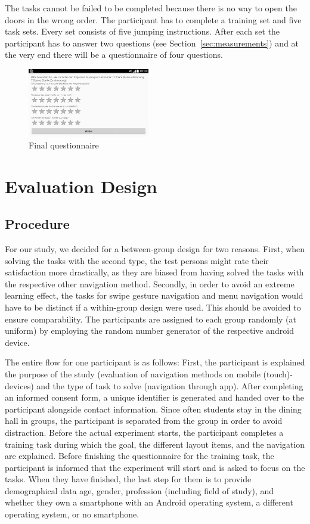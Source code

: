 \documentclass{sig-alternate-05-2015}
\begin{document}
The tasks cannot be failed to be completed because there is no way to open the doors in the wrong order. The participant has to complete a training set and five task sets. Every set consists of five jumping instructions. After each set the participant has to answer two questions (see Section~\ref{sec:measurements}) and at the very end there will be a questionnaire of four questions.
\begin{figure}
	\centering
	\includegraphics[width=0.475\textwidth]{pics/screenshots/global5-cut}
	\caption{Final questionnaire}
	\label{fig:final_questionnaire}
\end{figure}
\section{Evaluation Design}
\subsection{Procedure}
For our study, we decided for a between-group design for two reasons. First,
when solving the tasks with the second type, the test persons might rate their
satisfaction more drastically, as they are biased from having solved the tasks
with the respective other navigation method. Secondly, in order to avoid an
extreme learning effect, the tasks for swipe gesture navigation and menu
navigation would have to be distinct if a within-group design were used. This
should be avoided to ensure comparability. The participants are assigned to
each group randomly (at uniform) by employing the random number generator of
the respective android device.

The entire flow for one participant is as follows: First, the participant is explained
the purpose of the study (evaluation of navigation methods on mobile (touch)-devices) and the
type of task to solve (navigation through app). After completing an informed consent form, a unique
identifier is generated and handed over to the participant alongside contact information. Since often students
stay in the dining hall in groups, the participant is separated from the group in order to avoid distraction. 
Before the actual experiment starts, the participant completes a training task during which the goal, the
different layout items, and the navigation are explained. Before finishing the questionnaire for the training
task, the participant is informed that the experiment will start and is asked to focus on the tasks. When they have
finished, the last step for them is to provide demographical data age, gender, profession (including field of study),
and whether they own a smartphone with an Android operating system, a different operating system, or no smartphone.
\end{document}
